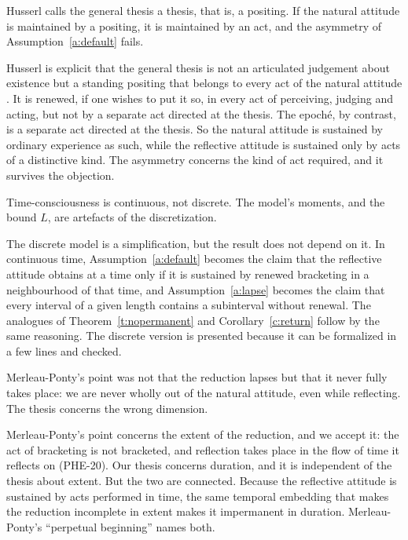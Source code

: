 \documentclass{situationist-preprint}
\begin{document}
\begin{objection}
Husserl calls the general thesis a thesis, that is, a positing. If the natural attitude is maintained by a positing, it is maintained by an act, and the asymmetry of Assumption~\ref{a:default} fails.
\end{objection}

\begin{reply}
Husserl is explicit that the general thesis is not an articulated judgement about existence but a standing positing that belongs to every act of the natural attitude \citep[§31]{Husserl1913}. It is renewed, if one wishes to put it so, in every act of perceiving, judging and acting, but not by a separate act directed at the thesis. The epoché, by contrast, is a separate act directed at the thesis. So the natural attitude is sustained by ordinary experience as such, while the reflective attitude is sustained only by acts of a distinctive kind. The asymmetry concerns the kind of act required, and it survives the objection.
\end{reply}

\begin{objection}
Time-consciousness is continuous, not discrete. The model's moments, and the bound $L$, are artefacts of the discretization.
\end{objection}

\begin{reply}
The discrete model is a simplification, but the result does not depend on it. In continuous time, Assumption~\ref{a:default} becomes the claim that the reflective attitude obtains at a time only if it is sustained by renewed bracketing in a neighbourhood of that time, and Assumption~\ref{a:lapse} becomes the claim that every interval of a given length contains a subinterval without renewal. The analogues of Theorem~\ref{t:nopermanent} and Corollary~\ref{c:return} follow by the same reasoning. The discrete version is presented because it can be formalized in a few lines and checked.
\end{reply}

\begin{objection}
Merleau-Ponty's point was not that the reduction lapses but that it never fully takes place: we are never wholly out of the natural attitude, even while reflecting. The thesis concerns the wrong dimension.
\end{objection}

\begin{reply}
Merleau-Ponty's point concerns the extent of the reduction, and we accept it: the act of bracketing is not bracketed, and reflection takes place in the flow of time it reflects on (PHE-20). Our thesis concerns duration, and it is independent of the thesis about extent. But the two are connected. Because the reflective attitude is sustained by acts performed in time, the same temporal embedding that makes the reduction incomplete in extent makes it impermanent in duration. Merleau-Ponty's \enquote{perpetual beginning} names both.
\end{reply}
\end{document}
